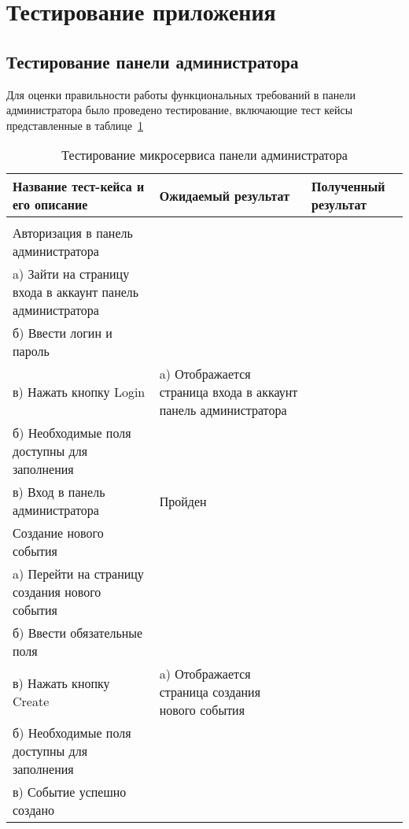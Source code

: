 \section{Тестирование приложения}
\label{sec:testing}


\subsection{Тестирование панели администратора}
Для оценки правильности работы функциональных требований в панели администратора было проведено тестирование, включающие тест кейсы представленные      в таблице~\ref{table:testing:admin} 
  
\begin{longtable}[l]{| >{\raggedright}m{}
                  | >{\raggedright}m{}
                  | >{\raggedright\arraybackslash}m{}|}
  \caption{Тестирование микросервиса панели администратора}
  \label{table:testing:admin} \tabularnewline


    \hline
    Название тест-кейса и его описание & Ожидаемый результат  & Полученный результат \\
    \hline
    \centering{1} & \centering{2} & \centering{3} \tabularnewline
    \hline

    Авторизация в панель администратора \\
    a) Зайти на страницу входа в аккаунт панель администратора \\
    б) Ввести логин и пароль \\
    в) Нажать кнопку Login 

    & 

    a) Отображается страница входа в аккаунт панель администратора \\
    б) Необходимые поля доступны для заполнения \\
    в) Вход в панель администратора

    & 

    Пройден \\ \hline

    Создание нового события \\
    a) Перейти на страницу создания нового события \\
    б) Ввести обязательные поля \\
    в) Нажать кнопку Create 

    & 

    a) Отображается страница создания нового события \\
    б) Необходимые поля доступны для заполнения \\
    в) Событие успешно создано 
    

\end{longtable}
